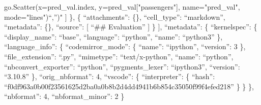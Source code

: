 \documentclass[
]{article}
\begin{document}
go.Scatter(x=pred\_val.index, y=pred\_val{[}"passengers"{]},
name="pred\_val", mode="lines")\n``,'')\n" {]} \}, \{ ``attachments'':
\{\}, ``cell\_type'': ``markdown'', ``metadata'': \{\}, ``source'': {[}
``\#\# Evaluation\n'' {]} \} {]}, ``metadata'': \{ ``kernelspec'': \{
``display\_name'': ``base'', ``language'': ``python'', ``name'':
``python3'' \}, ``language\_info'': \{ ``codemirror\_mode'': \{
``name'': ``ipython'', ``version'': 3 \}, ``file\_extension'': ``.py'',
``mimetype'': ``text/x-python'', ``name'': ``python'',
``nbconvert\_exporter'': ``python'', ``pygments\_lexer'': ``ipython3'',
``version'': ``3.10.8'' \}, ``orig\_nbformat'': 4, ``vscode'': \{
``interpreter'': \{ ``hash'':
``f0df963a0b00f23561625d2ba0a0b8b2d4dd4941b6b854c35050f99f4efed218'' \}
\} \}, ``nbformat'': 4, ``nbformat\_minor'': 2 \}
\end{document}
